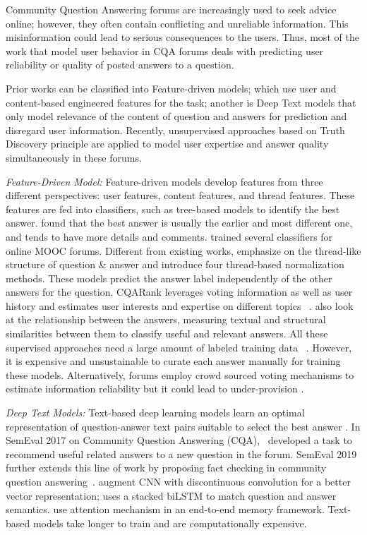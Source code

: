 Community Question Answering forums are increasingly used to seek advice online; however, they often contain conflicting and unreliable information. This misinformation could lead to serious consequences to the users. Thus, most of the work that model user behavior in CQA forums deals with predicting user reliability or quality of posted answers to a question.

Prior works can be classified into Feature-driven models; which use user and content-based engineered features for the task; another is Deep Text models that only model relevance of the content of question and answers for prediction and disregard user information. Recently, unsupervised approaches based on Truth Discovery principle are applied to model user expertise and answer quality simultaneously in these forums.

\noindent
\emph{Feature-Driven Model:}
Feature-driven models \cite{BurelMA16} develop features from three different perspectives: user features, content features, and thread features.
These features are fed into classifiers, such as tree-based models \cite{BurelMA16, JendersKN16, TianZL13} to identify the best answer. \citet{TianZL13} found that the best answer is usually the earlier and most different one, and tends to have more details and comments. \citet{JendersKN16} trained several classifiers for online MOOC forums. Different from existing works, \citet{BurelMA16} emphasize on the thread-like structure of question \& answer and introduce four thread-based normalization methods. These models predict the answer label independently of the other answers for the question.
CQARank leverages voting information as well as user history and estimates user interests and expertise on different topics ~\cite{yang2013cqarank}. \citet{barron2015thread} also look at the relationship between the answers, measuring textual and structural similarities between them to classify useful and relevant answers. All these supervised approaches need a large amount of labeled training data ~\cite{wen2018hybrid, mihaylova2018fact,oh2013finding}. However, it is expensive and unsustainable to curate each answer manually for training these models. Alternatively, forums employ crowd sourced voting mechanisms to estimate information reliability but it could lead to under-provision \cite{gilbert2013widespread}.

\noindent
\emph{Deep Text Models:} Text-based deep learning models learn an optimal representation of question-answer text pairs suitable to select the best answer \cite{ZhangLSW17, WuWS18, WangN15}. In SemEval 2017 on Community Question Answering (CQA),~\cite{nakov2017semeval} developed a task to recommend useful related answers to a new question in the forum.
SemEval 2019 further extends this line of work by proposing fact checking in community question answering~\cite{Mihaylova2019semeval}. \citet{FengXGWZ15} augment CNN with discontinuous convolution for a better vector representation; \citet{WangN15} uses a stacked biLSTM to match question and answer semantics. \citet{SukhbaatarSWF15} use attention mechanism in an end-to-end memory framework. Text-based models take longer to train and are computationally expensive.

